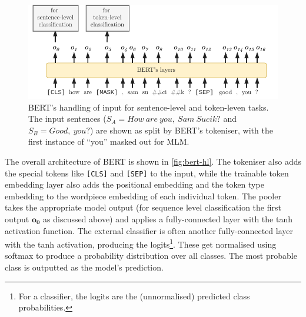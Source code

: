 \documentclass[bsc,frontabs,twoside,singlespacing,parskip,deptreport]{infthesis}
\begin{document}
{{{      \begin{figure}[h!t]
        \centering
        \includegraphics[width=14cm]{graphics/bert-inputs}
        \caption{BERT's handling of input for sentence-level and token-leven tasks. The input sentences ($S_A = How\ are\ you,\ Sam\ Sucik?$ and $S_B = Good,\ you?$) are shown as split by BERT's tokeniser, with the first instance of ``you'' masked out for MLM.}
        \label{fig:bert-inputs}
      \end{figure}
      The overall architecture of BERT is shown in \autoref{fig:bert-hl}. The tokeniser also adds the special tokens like \verb|[CLS]| and \verb|[SEP]| to the input, while the trainable token embedding layer also adds the positional embedding and the token type embedding to the wordpiece embedding of each individual token. The pooler takes the appropriate model output (for sequence level classification the first output $\bm{o_0}$ as discussed above) and applies a fully-connected layer with the tanh activation function.
      The external classifier is often another fully-connected layer with the tanh activation, producing the logits\footnote{For a classifier, the logits are the (unnormalised) predicted class probabilities.}. These get normalised using softmax to produce a probability distribution over all classes. The most probable class is outputted as the model's prediction.
      
}}}
\end{document}
